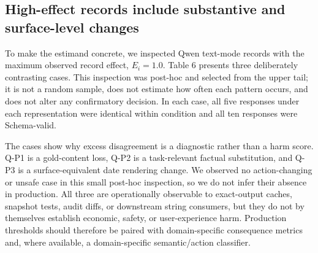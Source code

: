 \documentclass[11pt,a4paper]{article}
\begin{document}
\subsection{High-effect records include substantive and surface-level changes}
To make the estimand concrete, we inspected Qwen text-mode records with the maximum observed record effect, \(E_i=1.0\). Table 6 presents three deliberately contrasting cases. This inspection was post-hoc and selected from the upper tail; it is not a random sample, does not estimate how often each pattern occurs, and does not alter any confirmatory decision. In each case, all five responses under each representation were identical within condition and all ten responses were Schema-valid.

\begin{table}[t]
\caption{Selected high-effect Qwen text-mode cases; post-hoc and non-representative.}
\label{tab:markdown-6}
\centering
{}
\end{table}
The cases show why excess disagreement is a diagnostic rather than a harm score. Q-P1 is a gold-content loss, Q-P2 is a task-relevant factual substitution, and Q-P3 is a surface-equivalent date rendering change. We observed no action-changing or unsafe case in this small post-hoc inspection, so we do not infer their absence in production. All three are operationally observable to exact-output caches, snapshot tests, audit diffs, or downstream string consumers, but they do not by themselves establish economic, safety, or user-experience harm. Production thresholds should therefore be paired with domain-specific consequence metrics and, where available, a domain-specific semantic/action classifier.
\end{document}
